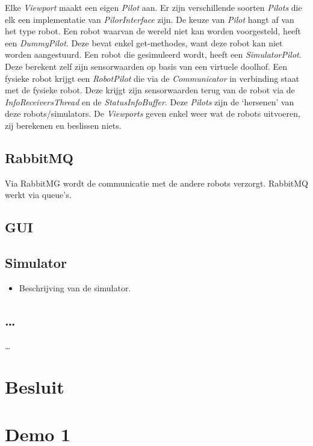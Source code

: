 \documentclass[tt1]{penoverslag}
\begin{document}
Elke \textit{Viewport} maakt een eigen \textit{Pilot} aan. Er zijn verschillende soorten \textit{Pilots} die elk een implementatie van \textit{PilorInterface} zijn. De keuze van \textit{Pilot} hangt af van het type robot. Een robot waarvan de wereld niet kan worden voorgesteld, heeft een \textit{DummyPilot}. Deze bevat enkel get-methodes, want deze robot kan niet worden aangestuurd. Een robot die gesimuleerd wordt, heeft een \textit{SimulatorPilot}. Deze berekent zelf zijn sensorwaarden op basis van een virtuele doolhof. Een fysieke robot krijgt een \textit{RobotPilot} die via de \textit{Communicator} in verbinding staat met de fysieke robot. Deze krijgt zijn sensorwaarden terug van de robot via de \textit{InfoReceiversThread} en de \textit{StatusInfoBuffer}. Deze \textit{Pilots} zijn de `hersenen' van deze robots/simulators. De \textit{Viewports} geven enkel weer wat de robots uitvoeren, zij berekenen en beslissen niets.

\subsection{RabbitMQ}
\label{secc:RabbMQ}
Via RabbitMG wordt de communicatie met de andere robots verzorgt. RabbitMQ werkt via queue's. %

\subsection{GUI}


\subsection{Simulator}
\begin{itemize}
\item Beschrijving van de simulator.
\end{itemize}



\subsection{\ldots}
\ldots


\section{Besluit}



\newpage
\makeappendix

\section{Demo 1}
\end{document}
